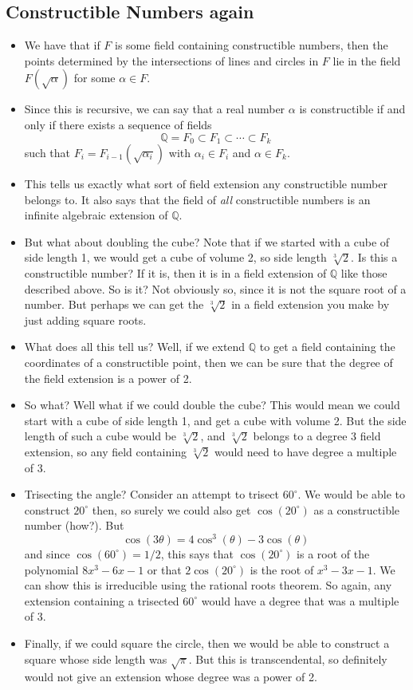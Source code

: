 \documentclass[12pt]{article}
\theoremstyle{plain}
\theoremstyle{definition}
\theoremstyle{remark}
\def\Q{\mathbb Q}
\begin{document}
\subsection*{Constructible Numbers again}
\begin{itemize}
  \item We have that if $F$ is some field containing constructible numbers, then the points determined by the intersections of lines and circles in $F$ lie in the field $F(\sqrt{\alpha})$ for some $\alpha \in F$.
  \item Since this is recursive, we can say that a real number $\alpha$ is constructible if and only if there exists a sequence of fields 
  \[{\mathbb Q} = F_0 \subset F_1 \subset \cdots \subset F_k\]
  such that $F_i = F_{i-1}(\sqrt{\alpha_i})$ with $\alpha_i \in F_i$ and $\alpha \in F_k$.

  \item This tells us exactly what sort of field extension any constructible number belongs to.  It also says that the field of \emph{all} constructible numbers is an infinite algebraic extension of $\Q$.

  \item But what about doubling the cube?  Note that if we started with a cube of side length 1, we would get a cube of volume 2, so side length $\sqrt[3]{2}$.  Is this a constructible number?  If it is, then it is in a field extension of $\Q$ like those described above.  So is it?  Not obviously so, since it is not the square root of a number.  But perhaps we can get the $\sqrt[3]{2}$ in a field extension you make by just adding square roots.

  \item What does all this tell us?  Well, if we extend $\Q$ to get a field containing the coordinates of a constructible point, then we can be sure that the degree of the field extension is a power of 2.
  \item So what?  Well what if we could double the cube?  This would mean we could start with a cube of side length 1, and get a cube with volume 2.  But the side length of such a cube would be $\sqrt[3]{2}$, and $\sqrt[3]{2}$ belongs to a degree 3 field extension, so any field containing $\sqrt[3]{2}$ would need to have degree a multiple of 3.
  \item Trisecting the angle?  Consider an attempt to trisect $60^\circ$.  We would be able to construct $20^\circ$ then, so surely we could also get $\cos(20^\circ)$ as a constructible number (how?).  But
  \[\cos(3\theta) = 4\cos^3(\theta) - 3 \cos(\theta)\]
  and since $\cos(60^\circ) = 1/2$, this says that $\cos(20^\circ)$ is a root of the polynomial $8x^3 - 6x - 1$ or that $2\cos(20^\circ)$ is the root of $x^3 - 3x - 1$.  We can show this is irreducible using the rational roots theorem.  So again, any extension containing a trisected $60^\circ$ would have a degree that was a multiple of 3.
  \item Finally, if we could square the circle, then we would be able to construct a square whose side length was $\sqrt{\pi}$.  But this is transcendental, so definitely would not give an extension whose degree was a power of 2.
\end{itemize}
\end{document}
